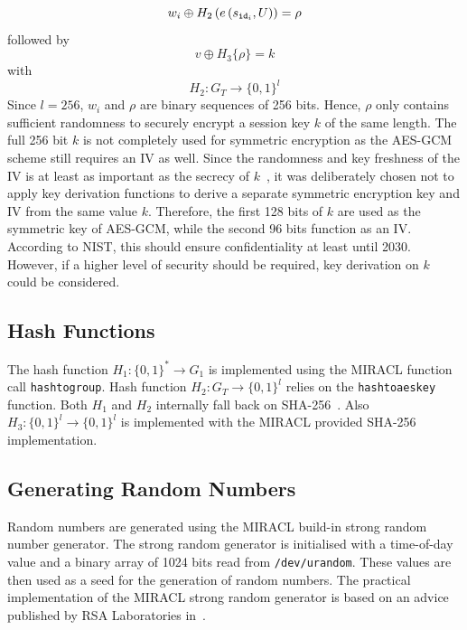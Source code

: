 \begin{equation*}
 w_i \oplus H_2 \left( e \left( s_{\mathtt{id}_{i}}, U \right) \right) = \rho
\end{equation*}
followed by
\begin{equation*}
 v \oplus H_3 \{ \rho \} = k
\end{equation*}
with
\begin{equation*}
 H_2: G_T \rightarrow \{ 0,1 \}^{l}
\end{equation*}
Since $l=256$, $w_i$ and $\rho$ are binary sequences of 256 bits. Hence, $\rho$ only contains sufficient randomness to securely encrypt a session key $k$ of the same length. The full 256 bit $k$ is not completely used for symmetric encryption as the AES-GCM scheme still requires an IV as well. Since the randomness and key freshness of the IV is at least as important as the secrecy of $k$~\cite{nist:dworkin}, it was deliberately chosen not to apply key derivation functions to derive a separate symmetric encryption key and IV from the same value $k$. Therefore, the first 128 bits of $k$ are used as the symmetric key of AES-GCM, while the second 96 bits function as an IV. According to NIST, this should ensure confidentiality at least until 2030. However, if a higher level of security should be required, key derivation on $k$ could be considered.

\subsection{Hash Functions}
The hash function $H_1: \{ 0,1 \}^{*} \rightarrow G_1$ is implemented using the MIRACL function call \texttt{hash\textunderscore to\textunderscore group}. Hash function $H_2: G_T \rightarrow \{ 0,1 \}^{l}$ relies on the \texttt{hash\textunderscore to\textunderscore aes\textunderscore key} function. Both $H_1$ and $H_2$ internally fall back on SHA-256~\cite{nist:fips_180_4}. Also $H_3: \{ 0, 1 \}^{l} \rightarrow \{ 0,1 \}^{l}$ is implemented with the MIRACL provided SHA-256 implementation.

\subsection{Generating Random Numbers}
Random numbers are generated using the MIRACL build-in strong random number generator. The strong random generator is initialised with a time-of-day value and a binary array of 1024 bits read from \texttt{/dev/urandom}. These values are then used as a seed for the generation of random numbers. The practical implementation of the MIRACL strong random generator is based on an advice published by RSA Laboratories in~\cite{art:Matthews96}.

